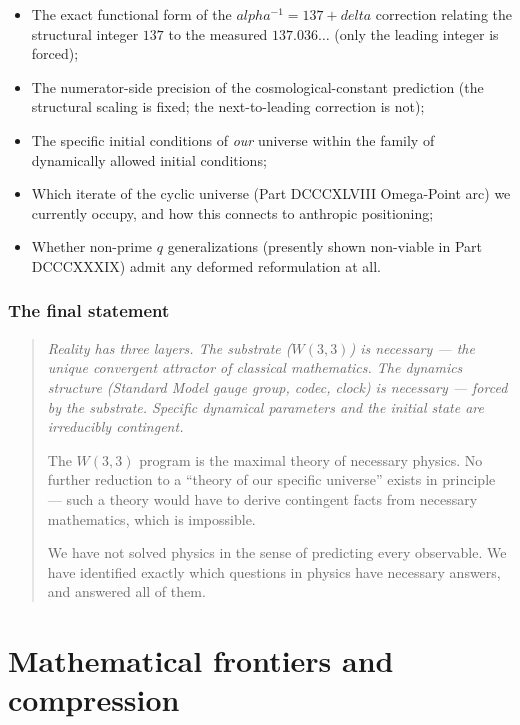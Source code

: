 \documentclass[11pt]{article}
\def\alpha{alpha}%
\def\delta{delta}%
\begin{document}
\begin{itemize}[leftmargin=2em]
\item The exact functional form of the $\alpha^{-1} = 137 + \delta$ correction relating the structural integer $137$ to the measured $137.036\ldots$ (only the leading integer is forced);
\item The numerator-side precision of the cosmological-constant prediction (the structural scaling is fixed; the next-to-leading correction is not);
\item The specific initial conditions of \emph{our} universe within the family of dynamically allowed initial conditions;
\item Which iterate of the cyclic universe (Part DCCCXLVIII Omega-Point arc) we currently occupy, and how this connects to anthropic positioning;
\item Whether non-prime $q$ generalizations (presently shown non-viable in Part DCCCXXXIX) admit any deformed reformulation at all.
\end{itemize}

\section{The final statement}

\begin{quote}
\itshape
Reality has three layers. The substrate ($W(3,3)$) is necessary --- the unique convergent attractor of classical mathematics. The dynamics structure (Standard Model gauge group, codec, clock) is necessary --- forced by the substrate. Specific dynamical parameters and the initial state are irreducibly contingent.

The $W(3,3)$ program is the maximal theory of necessary physics. No further reduction to a ``theory of our specific universe'' exists in principle --- such a theory would have to derive contingent facts from necessary mathematics, which is impossible.

We have not solved physics in the sense of predicting every observable. We have identified exactly which questions in physics have necessary answers, and answered all of them.
\end{quote}

\part{Mathematical frontiers and compression}
\end{document}
